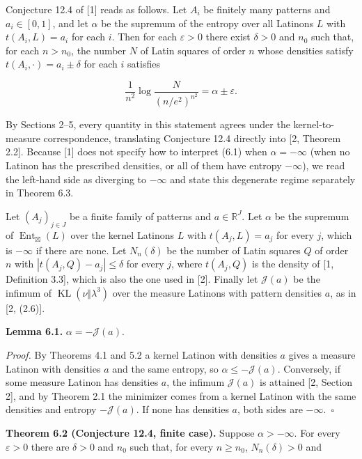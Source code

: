\documentclass[english,11pt,a4paper]{article}
\newcounter{none}
\begin{document}
Conjecture 12.4 of {[}1{]} reads as follows. Let \(A_i\) be finitely many patterns and \(a_i\in[0,1]\), and let \(\alpha\) be the supremum of the entropy over all Latinons \(L\) with \(t(A_i,L)=a_i\) for each \(i\). Then for each \(\varepsilon>0\) there exist \(\delta>0\) and \(n_0\) such that, for each \(n>n_0\), the number \(N\) of Latin squares of order \(n\) whose densities satisfy \(t(A_i,\cdot)=a_i\pm\delta\) for each \(i\) satisfies

\nopagebreak[4]
\[\frac1{n^2}\log\frac{N}{(n/e^2)^{n^2}}=\alpha\pm\varepsilon.\tag{6.1}\]

By Sections 2--5, every quantity in this statement agrees under the kernel-to-measure correspondence, translating Conjecture 12.4 directly into {[}2, Theorem 2.2{]}. Because {[}1{]} does not specify how to interpret (6.1) when \(\alpha=-\infty\) (when no Latinon has the prescribed densities, or all of them have entropy \(-\infty\)), we read the left-hand side as diverging to \(-\infty\) and state this degenerate regime separately in Theorem 6.3.

Let \((A_j)_{j\in J}\) be a finite family of patterns and \(a\in\mathbb R^J\). Let \(\alpha\) be the supremum of \(\operatorname{Ent}_{\boxtimes}(L)\) over the kernel Latinons \(L\) with \(t(A_j,L)=a_j\) for every \(j\), which is \(-\infty\) if there are none. Let \(N_n(\delta)\) be the number of Latin squares \(Q\) of order \(n\) with \(|t(A_j,Q)-a_j|\le\delta\) for every \(j\), where \(t(A_j,Q)\) is the density of {[}1, Definition 3.3{]}, which is also the one used in {[}2{]}. Finally let \(\mathcal J(a)\) be the infimum of \(\operatorname{KL}(\nu\Vert\lambda^3)\) over the measure Latinons with pattern densities \(a\), as in {[}2, (2.6){]}.

\textbf{Lemma 6.1.} \(\alpha=-\mathcal J(a)\).

\emph{Proof.} By Theorems 4.1 and 5.2 a kernel Latinon with densities \(a\) gives a measure Latinon with densities \(a\) and the same entropy, so \(\alpha\le-\mathcal J(a)\). Conversely, if some measure Latinon has densities \(a\), the infimum \(\mathcal J(a)\) is attained {[}2, Section 2{]}, and by Theorem 2.1 the minimizer comes from a kernel Latinon with the same densities and entropy \(-\mathcal J(a)\). If none has densities \(a\), both sides are \(-\infty\).~\(\square\)

\textbf{Theorem 6.2 (Conjecture 12.4, finite case).} Suppose \(\alpha>-\infty\). For every \(\varepsilon>0\) there are \(\delta>0\) and \(n_0\) such that, for every \(n\ge n_0\), \(N_n(\delta)>0\) and
\end{document}
